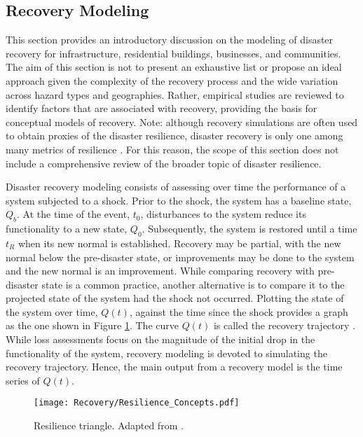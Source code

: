 
\begin{partbacktext}
\part{Recovery Modeling}
\label{part:recovery}

This section provides an introductory discussion on the modeling of disaster recovery for infrastructure, residential buildings, businesses, and communities. The aim of this section is not to present an exhaustive list or propose an ideal approach given the complexity of the recovery process and the wide variation across hazard types and geographies. Rather, empirical studies are reviewed to identify factors that are associated with recovery, providing the basis for conceptual models of recovery. Note: although recovery simulations are often used to obtain proxies of the disaster resilience, disaster recovery is only one among many metrics of resilience \citep{national2019building,kwasinski2016conceptual}. For this reason, the scope of this section does not include a comprehensive review of the broader topic of disaster resilience.\

Disaster recovery modeling consists of assessing over time the performance of a system subjected to a shock. Prior to the shock, the system has a baseline state, $Q_b$. At the time of the event, $t_0$, disturbances to the system reduce its functionality to a new state, $Q_0$. Subsequently, the system is restored until a time $t_R$ when its new normal is established. Recovery may be partial, with the new normal below the pre-disaster state, or improvements may be done to the system and the new normal is an improvement. While comparing recovery with pre-disaster state is a common practice, another alternative is to compare it to the projected state of the system had the shock not occurred. Plotting the state of the system over time, $Q(t)$, against the time since the shock provides a graph as the one shown in Figure \ref{fig:ResilienceTriangle}. The curve $Q(t)$ is called the recovery trajectory \citep{Bruneau2003}. While loss assessments focus on the magnitude of the initial drop in the functionality of the system, recovery modeling is devoted to simulating the recovery trajectory. Hence, the main output from a recovery model is the time series of $Q(t)$.\

\begin{figure}[htb]
    \centering
    \texttt{[image: Recovery/Resilience\_Concepts.pdf]}
    \caption{Resilience triangle. Adapted from \cite{Bruneau2003}.}
    \label{fig:ResilienceTriangle}
\end{figure}


\end{partbacktext}
